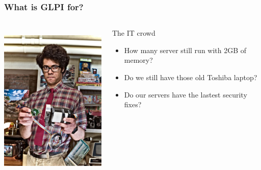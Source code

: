 \documentclass{beamer}
\begin{document}
\begin{frame}
    \frametitle{What is GLPI for?}

 \begin{columns}
 \begin{column}{0.35\textwidth}
         \includegraphics[height=7.5cm]{./pics/itcrowd.jpg}
 \end{column}
 \begin{column}{0.65\textwidth}
    \begin{block}{The IT crowd}
        \begin{itemize}
            \item How many server still run with 2GB of memory?
            \item Do we still have those old Toshiba laptop?
            \item Do our servers have the lastest security fixes?
        \end{itemize}
    \end{block}
 \end{column}
\end{columns}

 \end{frame}
\end{document}
